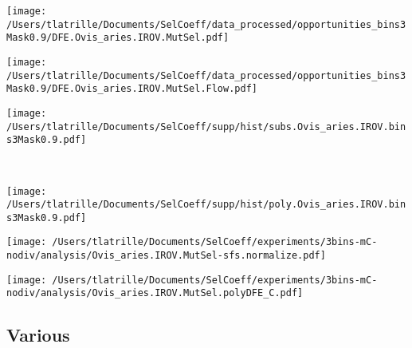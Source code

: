 \documentclass{article}
\begin{document}
    \begin{minipage}{0.32\linewidth}
        \texttt{[image: /Users/tlatrille/Documents/SelCoeff/data\_processed/opportunities\_bins3Mask0.9/DFE.Ovis\_aries.IROV.MutSel.pdf]}
    \end{minipage}
    \begin{minipage}{0.32\linewidth}
        \texttt{[image: /Users/tlatrille/Documents/SelCoeff/data\_processed/opportunities\_bins3Mask0.9/DFE.Ovis\_aries.IROV.MutSel.Flow.pdf]}
    \end{minipage}
    \begin{minipage}{0.32\linewidth}
        \texttt{[image: /Users/tlatrille/Documents/SelCoeff/supp/hist/subs.Ovis\_aries.IROV.bins3Mask0.9.pdf]}
    \end{minipage}
    \\
    \begin{minipage}{0.32\linewidth}
        \texttt{[image: /Users/tlatrille/Documents/SelCoeff/supp/hist/poly.Ovis\_aries.IROV.bins3Mask0.9.pdf]}
    \end{minipage}
    \begin{minipage}{0.32\linewidth}
        \texttt{[image: /Users/tlatrille/Documents/SelCoeff/experiments/3bins-mC-nodiv/analysis/Ovis\_aries.IROV.MutSel-sfs.normalize.pdf]}
    \end{minipage}
    \begin{minipage}{0.32\linewidth}
        \texttt{[image: /Users/tlatrille/Documents/SelCoeff/experiments/3bins-mC-nodiv/analysis/Ovis\_aries.IROV.MutSel.polyDFE\_C.pdf]}
    \end{minipage}
    \subsection{Various}
\end{document}
